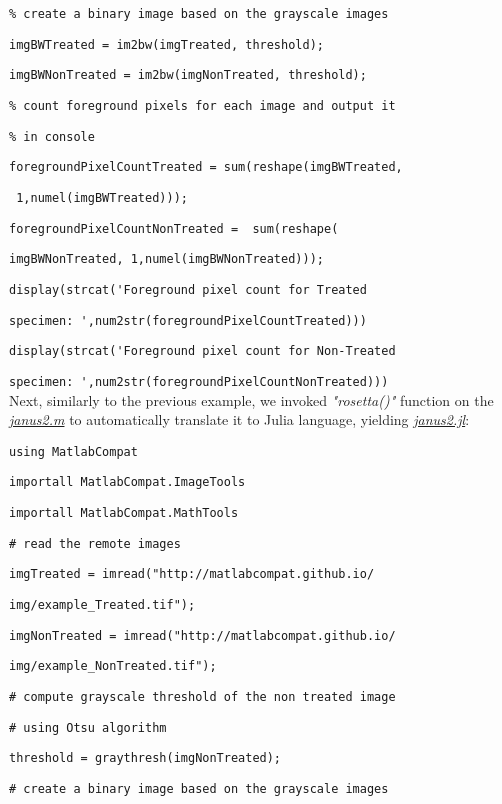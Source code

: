 \verb|% create a binary image based on the grayscale images|

\verb|imgBWTreated = im2bw(imgTreated, threshold);|

\verb|imgBWNonTreated = im2bw(imgNonTreated, threshold);|

\verb|% count foreground pixels for each image and output it|

\verb|% in console|

\verb|foregroundPixelCountTreated = sum(reshape(imgBWTreated,|

\verb| 1,numel(imgBWTreated)));|

\verb|foregroundPixelCountNonTreated =  sum(reshape(|

\verb|imgBWNonTreated, 1,numel(imgBWNonTreated)));|

\verb|display(strcat('Foreground pixel count for Treated |

\verb|specimen: ',num2str(foregroundPixelCountTreated)))|

\verb|display(strcat('Foreground pixel count for Non-Treated|

\verb|specimen: ',num2str(foregroundPixelCountNonTreated)))|\\


Next, similarly to the previous example, we invoked \textit{"rosetta()"} function on the \textit{\href{https://github.com/MatlabCompat/MatlabCompat.jl/blob/master/test/janus2.m}{janus2.m}} to automatically translate it to Julia language, yielding \textit{\href{https://github.com/MatlabCompat/MatlabCompat.jl/blob/master/test/janus2.jl}{janus2.jl}}:


\verb|using MatlabCompat|

\verb|importall MatlabCompat.ImageTools|

\verb|importall MatlabCompat.MathTools|

\verb|# read the remote images|

\verb|imgTreated = imread("http://matlabcompat.github.io/|

\verb|img/example_Treated.tif");|

\verb|imgNonTreated = imread("http://matlabcompat.github.io/|

\verb|img/example_NonTreated.tif");|

\verb|# compute grayscale threshold of the non treated image|

\verb|# using Otsu algorithm|

\verb|threshold = graythresh(imgNonTreated);|

\verb|# create a binary image based on the grayscale images|

